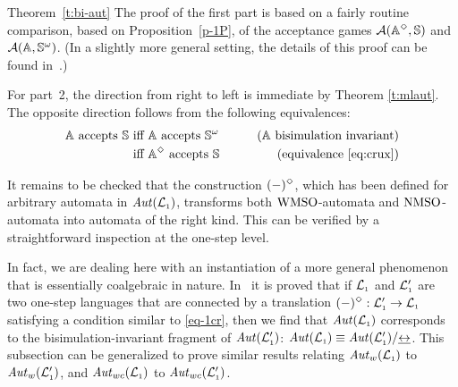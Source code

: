 \begin{proofof}{Theorem~\ref{t:bi-aut}}
The proof of the first part is based on a fairly routine comparison, based on
Proposition~\ref{p-1P}, of the acceptance games 
$\mathcal{A}(\mathbb{A}^{\Diamond},\mathbb{S})$ and $\mathcal{A}(\mathbb{A},\mathbb{S}^{\omega})$.
(In a slightly more general setting, the details of this proof can be found 
in~\cite{Venxx}.)

For part~2, the direction from right to left is immediate by Theorem \ref{t:mlaut}.
The opposite direction follows from the following equivalences:
\begin{align*}
\bbA \text{ accepts } \bbS
  & \text{ iff } \bbA \text{ accepts } \bbS^{\om}
  & \tag{$\bbA$ bisimulation invariant}
\\ & \text{ iff } \bbA^{\tmod} \text{ accepts } \bbS
  & \tag{equivalence~\eqref{eq:crux}}
\end{align*}

It remains to be checked that the construction $(-)^{\Diamond}$, which has
been defined for arbitrary automata in $\mathit{Aut}(\mathcal{L}_{\scriptscriptstyle 1})$, transforms 
both $\mathrm{WMSO}$-automata and $\mathrm{NMSO}$-automata into automata of the right kind.
This can be verified by a straightforward inspection at the one-step level.
\end{proofof}

\begin{remark}{\rm
In fact, we are dealing here with an instantiation of a more general phenomenon 
that is essentially coalgebraic in nature.
In~\cite{Venxx} it is proved that if $\mathcal{L}_{\scriptscriptstyle 1}$ and $\mathcal{L}_{\scriptscriptstyle 1}'$ are two one-step
languages that are connected by a translation $(-)^{\Diamond}: \mathcal{L}_{\scriptscriptstyle 1}' \to 
\mathcal{L}_{\scriptscriptstyle 1}$ satisfying a condition similar to \eqref{eq-1cr}, then we find that 
$\mathit{Aut}(\mathcal{L}_{\scriptscriptstyle 1})$ corresponds to the bisimulation-invariant fragment of 
$\mathit{Aut}(\mathcal{L}_{\scriptscriptstyle 1}')$: $\mathit{Aut}(\mathcal{L}_{\scriptscriptstyle 1}) \equiv \mathit{Aut}(\mathcal{L}_{\scriptscriptstyle 1}')/{\mathrel{\underline{\leftrightarrow}}}$.
This subsection can be generalized to prove similar results relating
$\mathit{Aut}_{w}(\mathcal{L}_{\scriptscriptstyle 1})$ to $\mathit{Aut}_{w}(\mathcal{L}_{\scriptscriptstyle 1}')$, and $\mathit{Aut}_{wc}(\mathcal{L}_{\scriptscriptstyle 1})$ to 
$\mathit{Aut}_{wc}(\mathcal{L}_{\scriptscriptstyle 1}')$.
}\end{remark}
